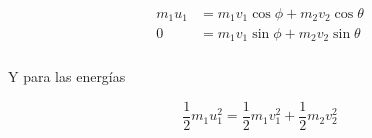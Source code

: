 \documentclass[a4paper,10pt]{article}
\begin{document}
\begin{gather}
 \begin{split}
%
m_1 u_1 &= m_1 v_1 \cos{\phi} + m_2 v_2 \cos{\theta} \\
%
0 &= m_1 v_1 \sin{\phi} + m_2 v_2 \sin{\theta} \\
%
\label{eq:momentaAngulos1}
\end{split}
\end{gather}

Y para las energías

\begin{equation}
 \frac{1}{2}m_1 u_1^2 = \frac{1}{2} m_1 v_1^2 + \frac{1}{2} m_2 v_2^2
 \label{eq:cineticas1}
\end{equation}






\end{document}
